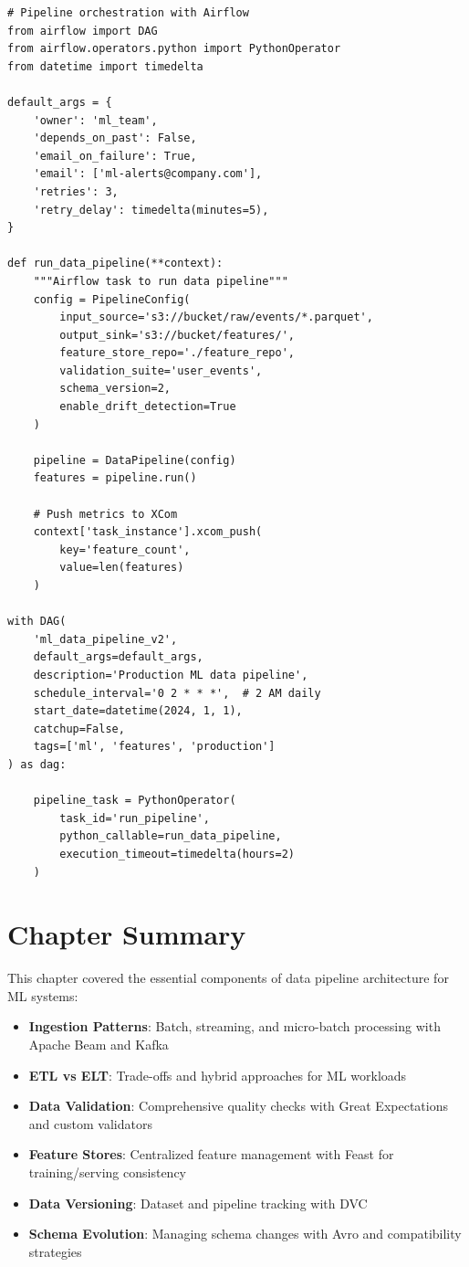 \begin{lstlisting}[style=python, caption=Complete production data pipeline]
# Pipeline orchestration with Airflow
from airflow import DAG
from airflow.operators.python import PythonOperator
from datetime import timedelta

default_args = {
    'owner': 'ml_team',
    'depends_on_past': False,
    'email_on_failure': True,
    'email': ['ml-alerts@company.com'],
    'retries': 3,
    'retry_delay': timedelta(minutes=5),
}

def run_data_pipeline(**context):
    """Airflow task to run data pipeline"""
    config = PipelineConfig(
        input_source='s3://bucket/raw/events/*.parquet',
        output_sink='s3://bucket/features/',
        feature_store_repo='./feature_repo',
        validation_suite='user_events',
        schema_version=2,
        enable_drift_detection=True
    )

    pipeline = DataPipeline(config)
    features = pipeline.run()

    # Push metrics to XCom
    context['task_instance'].xcom_push(
        key='feature_count',
        value=len(features)
    )

with DAG(
    'ml_data_pipeline_v2',
    default_args=default_args,
    description='Production ML data pipeline',
    schedule_interval='0 2 * * *',  # 2 AM daily
    start_date=datetime(2024, 1, 1),
    catchup=False,
    tags=['ml', 'features', 'production']
) as dag:

    pipeline_task = PythonOperator(
        task_id='run_pipeline',
        python_callable=run_data_pipeline,
        execution_timeout=timedelta(hours=2)
    )
\end{lstlisting}

\section{Chapter Summary}

This chapter covered the essential components of data pipeline architecture for ML systems:

\begin{itemize}
    \item \textbf{Ingestion Patterns}: Batch, streaming, and micro-batch processing with Apache Beam and Kafka
    \item \textbf{ETL vs ELT}: Trade-offs and hybrid approaches for ML workloads
    \item \textbf{Data Validation}: Comprehensive quality checks with Great Expectations and custom validators
    \item \textbf{Feature Stores}: Centralized feature management with Feast for training/serving consistency
    \item \textbf{Data Versioning}: Dataset and pipeline tracking with DVC
    \item \textbf{Schema Evolution}: Managing schema changes with Avro and compatibility strategies
\end{itemize}

